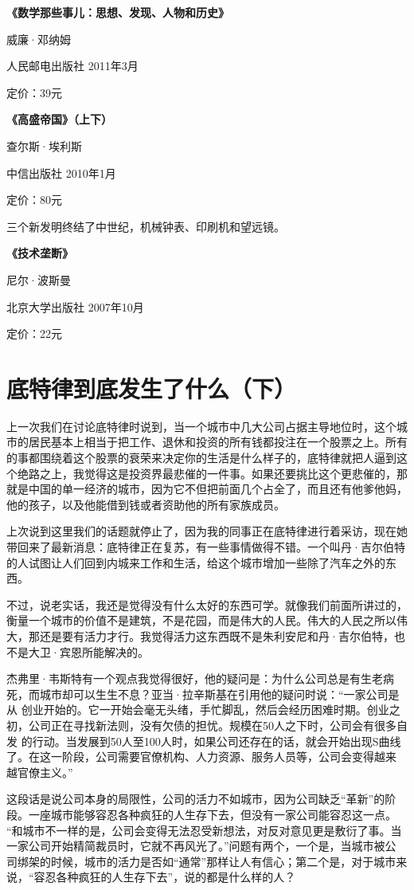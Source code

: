 \textbf{《数学那些事儿：思想、发现、人物和历史》}

威廉·邓纳姆

人民邮电出版社 2011年3月

定价：39元

\textbf{《高盛帝国》（上下）}

查尔斯·埃利斯

中信出版社 2010年1月

定价：80元

三个新发明终结了中世纪，机械钟表、印刷机和望远镜。

\textbf{《技术垄断》}

尼尔·波斯曼

北京大学出版社 2007年10月

定价：22元

\section{底特律到底发生了什么（下）}

上一次我们在讨论底特律时说到，当一个城市中几大公司占据主导地位时，这个城市的居民基本上相当于把工作、退休和投资的所有钱都投注在一个股票之上。所有
的事都围绕着这个股票的衰荣来决定你的生活是什么样子的，底特律就把人逼到这个绝路之上，我觉得这是投资界最悲催的一件事。如果还要挑比这个更悲催的，那
就是中国的单一经济的城市，因为它不但把前面几个占全了，而且还有他爹他妈，他的孩子，以及他能借到钱或者资助他的所有家族成员。

上次说到这里我们的话题就停止了，因为我的同事正在底特律进行着采访，现在她带回来了最新消息：底特律正在复苏，有一些事情做得不错。一个叫丹·吉尔伯特的人试图让人们回到内城来工作和生活，给这个城市增加一些除了汽车之外的东西。

不过，说老实话，我还是觉得没有什么太好的东西可学。就像我们前面所讲过的，衡量一个城市的价值不是建筑，不是花园，而是伟大的人民。伟大的人民之所以伟大，那还是要有活力才行。我觉得活力这东西既不是朱利安尼和丹·吉尔伯特，也不是大卫·宾恩所能解决的。

杰弗里·韦斯特有一个观点我觉得很好，他的疑问是：为什么公司总是有生老病死，而城市却可以生生不息？亚当·拉辛斯基在引用他的疑问时说：``一家公司是从
创业开始的。它一开始会毫无头绪，手忙脚乱，然后会经历困难时期。创业之初，公司正在寻找新法则，没有欠债的担忧。规模在50人之下时，公司会有很多自发
的行动。当发展到50人至100人时，如果公司还存在的话，就会开始出现S曲线了。在这一阶段，公司需要官僚机构、人力资源、服务人员等，公司会变得越来
越官僚主义。''

这段话是说公司本身的局限性，公司的活力不如城市，因为公司缺乏``革新''的阶段。一座城市能够容忍各种疯狂的人生存下去，但没有一家公司能容忍这一点。
``和城市不一样的是，公司会变得无法忍受新想法，对反对意见更是敷衍了事。当一家公司开始精简裁员时，它就不再风光了。''问题有两个，一个是，当城市被公
司绑架的时候，城市的活力是否如``通常''那样让人有信心；第二个是，对于城市来说，``容忍各种疯狂的人生存下去''，说的都是什么样的人？

